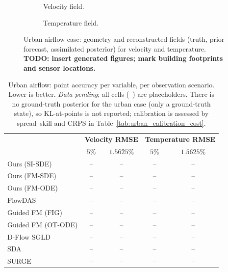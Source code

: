 \begin{figure}[ht]
    \centering
    \begin{subfigure}{0.48\linewidth}\centering
        \caption{Velocity field.}\label{fig:urban_vel}
    \end{subfigure}\hfill
    \begin{subfigure}{0.48\linewidth}\centering
        \caption{Temperature field.}\label{fig:urban_temp}
    \end{subfigure}
    \caption{Urban airflow case: geometry and reconstructed fields (truth, prior forecast, assimilated posterior) for velocity and temperature. \textbf{TODO: insert generated figures; mark building footprints and sensor locations.}}
    \label{fig:urban_fields}
\end{figure}

\begin{table}[ht]
    \centering
    \small
    \caption{Urban airflow: point accuracy per variable, per observation scenario. Lower is better. \emph{Data pending}; all cells (\texttt{--}) are placeholders. There is no ground-truth posterior for the urban case (only a ground-truth state), so KL-at-points is not reported; calibration is assessed by spread--skill and CRPS in Table~\ref{tab:urban_calibration_cost}.}
    \label{tab:urban_accuracy}
    \begin{tabular}{l|cc|cc}
        \toprule
        & \multicolumn{2}{c|}{\textbf{Velocity RMSE}}
        & \multicolumn{2}{c}{\textbf{Temperature RMSE}} \\
        & $5\%$ & $1.5625\%$ & $5\%$ & $1.5625\%$ \\
        \midrule
        Ours (SI-SDE) & -- & -- & -- & -- \\
        Ours (FM-SDE) & -- & -- & -- & -- \\
        Ours (FM-ODE) & -- & -- & -- & -- \\
        \midrule
        FlowDAS & -- & -- & -- & -- \\
        Guided FM (FIG) & -- & -- & -- & -- \\
        Guided FM (OT-ODE) & -- & -- & -- & -- \\
        D-Flow SGLD & -- & -- & -- & -- \\
        SDA & -- & -- & -- & -- \\
        SURGE & -- & -- & -- & -- \\
        \bottomrule
    \end{tabular}
\end{table}

